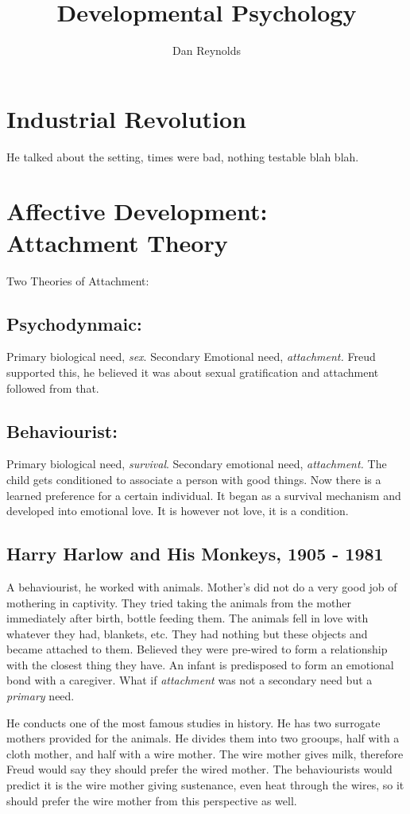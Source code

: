 \documentclass[12pt]{article}
\title{Developmental Psychology}
\author{Dan Reynolds}
\begin{document}
\maketitle
\section*{Industrial Revolution}
He talked about the setting, times were bad, nothing testable blah blah.
\section*{Affective Development: Attachment Theory}
Two Theories of Attachment:
\subsection*{Psychodynmaic:}
Primary biological need, \textit{sex}. Secondary Emotional need, \textit{attachment.} Freud supported this, he believed it was about sexual gratification and attachment followed from that.
\subsection*{Behaviourist:}
Primary biological need, \textit{survival}. Secondary emotional need, \textit{attachment.} The child gets conditioned to associate a person with good things. Now there is a learned preference for a certain individual. It began as a survival mechanism and developed into emotional love. It is however not love, it is a condition.
\subsection*{Harry Harlow and His Monkeys, 1905 - 1981}
A behaviourist, he worked with animals. Mother's did not do a very good job of mothering in captivity. They tried taking the animals from the mother immediately after birth, bottle feeding them. The animals fell in love with whatever they had, blankets, etc. They had nothing but these objects and became attached to them. Believed they were pre-wired to form a relationship with the closest thing they have. An infant is predisposed to form an emotional bond with a caregiver. What if \textit{attachment} was not a secondary need but a \textit{primary} need.

He conducts one of the most famous studies in history. He has two surrogate mothers provided for the animals. He divides them into two grooups, half with a cloth mother, and half with a wire mother. The wire mother gives milk, therefore Freud would say they should prefer the wired mother. The behaviourists would predict it is the wire mother giving sustenance, even heat through the wires, so it should prefer the wire mother from this perspective as well.
\end{document}

